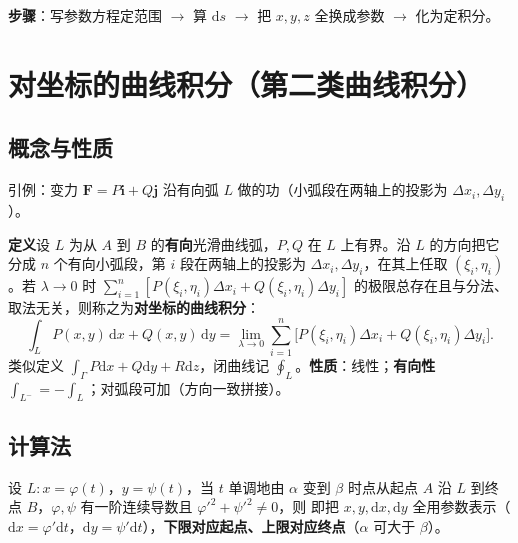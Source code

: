 \textbf{步骤}：写参数方程定范围 $\to$ 算 $\mathrm{d}s$ $\to$ 把 $x,y,z$ 全换成参数 $\to$ 化为定积分。


\section{对坐标的曲线积分（第二类曲线积分）}
\subsection{概念与性质}

引例：变力 $\boldsymbol F=P\boldsymbol i+Q\boldsymbol j$ 沿有向弧 $L$ 做的功（小弧段在两轴上的投影为 $\Delta x_i,\Delta y_i$）。

\textbf{定义}\quad 设 $L$ 为从 $A$ 到 $B$ 的\textbf{有向}光滑曲线弧，$P,Q$ 在 $L$ 上有界。沿 $L$ 的方向把它分成 $n$ 个有向小弧段，第 $i$ 段在两轴上的投影为 $\Delta x_i,\Delta y_i$，在其上任取 $(\xi_i,\eta_i)$。若 $\lambda\to0$ 时 $\sum\limits_{i=1}^{n}[P(\xi_i,\eta_i)\Delta x_i+Q(\xi_i,\eta_i)\Delta y_i]$ 的极限总存在且与分法、取法无关，则称之为\textbf{对坐标的曲线积分}：
\[
\int_LP(x,y)\,\mathrm{d}x+Q(x,y)\,\mathrm{d}y=\lim_{\lambda\to0}\sum_{i=1}^{n}\bigl[P(\xi_i,\eta_i)\Delta x_i+Q(\xi_i,\eta_i)\Delta y_i\bigr].
\]
类似定义 $\int_\Gamma P\mathrm{d}x+Q\mathrm{d}y+R\mathrm{d}z$，闭曲线记 $\oint_L$。\textbf{性质}：线性；\textbf{有向性} $\int_{L^{-}}=-\int_L$；对弧段可加（方向一致拼接）。

\subsection{计算法}

设 $L:x=\varphi(t)$，$y=\psi(t)$，当 $t$ 单调地由 $\alpha$ 变到 $\beta$ 时点从起点 $A$ 沿 $L$ 到终点 $B$，$\varphi,\psi$ 有一阶连续导数且 $\varphi'^2+\psi'^2\ne0$，则
即把 $x,y,\mathrm{d}x,\mathrm{d}y$ 全用参数表示（$\mathrm{d}x=\varphi'\mathrm{d}t$，$\mathrm{d}y=\psi'\mathrm{d}t$），\textbf{下限对应起点、上限对应终点}（$\alpha$ 可大于 $\beta$）。

